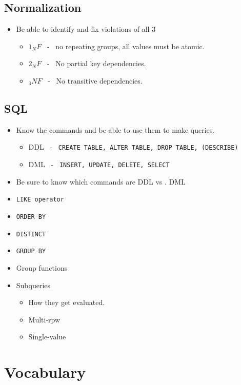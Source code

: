 \documentclass{report}
\begin{document}
\section{Normalization}
\begin{itemize}
    \item[\ding{228}] Be able to identify and fix violations of all 3
        \begin{itemize}[label=$\circ$]
            \item $1_NF$ \ - \ no repeating groups, all values must be atomic.
            \item $2_NF$ \ - \ No partial key dependencies.
            \item $_3NF$ \ - \ No transitive dependencies.
        \end{itemize}
\end{itemize}
\section{SQL}
\begin{itemize}
    \item[\ding{228}] Know the commands and be able to use them to make queries.
        \begin{itemize}[label=$\circ$]
            \item DDL \ - \ \texttt{CREATE TABLE, ALTER TABLE, DROP TABLE, (DESCRIBE)} 
            \item DML \ - \ \texttt{INSERT, UPDATE, DELETE, SELECT}
\end{itemize}
\item[\ding{228}] Be sure to know which commands are DDL vs . DML
\item[\ding{228}] \texttt{LIKE operator}
\item[\ding{228}] \texttt{ORDER BY}
\item[\ding{228}] \texttt{DISTINCT}
\item[\ding{228}] \texttt{GROUP BY}
\item[\ding{228}] Group functions
\item[\ding{228}] Subqueries 
    \begin{itemize}[label=$\circ$]
        \item How they get evaluated.
        \item Multi-rpw
        \item Single-value
    \end{itemize}
\end{itemize} 
\chapter{Vocabulary}
\end{document}
